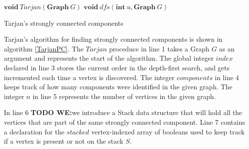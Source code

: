 \documentclass{l4proj}
\begin{document}

\begin{algorithm}[H]
\DontPrintSemicolon
\nl $\textbf{void} ~\mathit{Tarjan}(\textbf{Graph}~G)$ \;
\nl {}
\;
\nl $\textbf{void} ~\mathit{dfs}(\textbf{int}~u, \textbf{Graph}~G)$ \;
\nl {}
\caption{Tarjan's strongly connected components}
\label{TarjanPC}
\end{algorithm}

\noindent Tarjan's algorithm for finding strongly connected components is shown in algorithm \ref{TarjanPC}. The $Tarjan$ proceduce in line 1 takes a Graph $G$ as an argument and represents the start of the algorithm. The global integer $index$ declared in line 3 stores the current order in the depth-first search, and gets incremented each time a vertex is discovered. The integer $components$ in line 4 keeps track of how many components were identified in the given graph. The integer $n$ in line 5 represents the number of vertices in the given graph.

\noindent In line 6 \textbf{TODO WE:}we introduce a Stack data structure that will hold all the vertices that are part of the same strongly connected component. Line 7 contains a declaration for the $stacked$ vertex-indexed array of booleans used to keep track if a vertex is present or not on the stack $S$.
\end{document}
